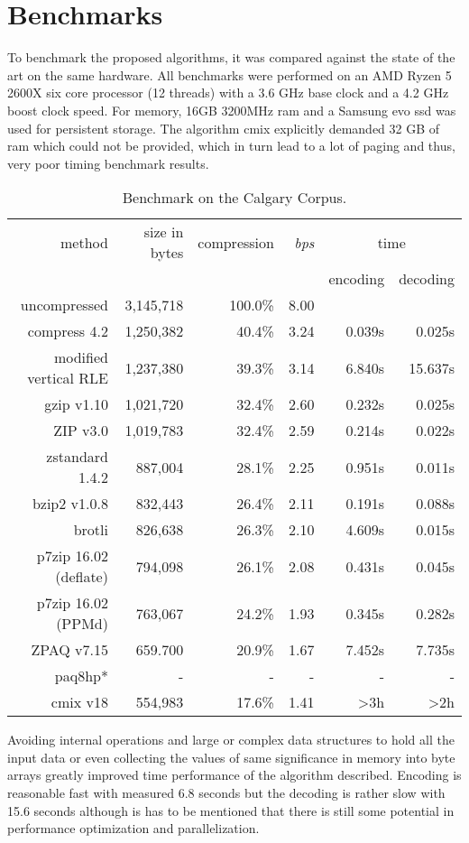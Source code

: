 \section{Benchmarks}
\label{ch:Evaluation:sec:Benchmarks}
\par{
	To benchmark the proposed algorithms, it was compared against the state of the art on the same hardware. All benchmarks were performed on an AMD Ryzen 5 2600X six core processor (12 threads) with a 3.6 GHz base clock and a 4.2 GHz boost clock speed. For memory, 16GB 3200MHz ram and a Samsung evo ssd was used for persistent storage. The algorithm cmix explicitly demanded 32 GB of ram which could not be provided, which in turn lead to a lot of paging and thus, very poor timing benchmark results.
}
	\begin{table}[h]
	\begin{tabular}{r|r|r|r|r|r}
		method  &  size in bytes & compression & \textit{bps} & \multicolumn{2}{c}{time }\\
		& & & & encoding & decoding\\
		\hline
		uncompressed & 3,145,718 & 100.0\% & 8.00 & &\\
		compress 4.2 & 1,250,382 & 40.4\% & 3.24 & 0.039s & 0.025s\\
		modified vertical RLE & 1,237,380 & 39.3\%& 3.14 & 6.840s & 15.637s\\
		gzip v1.10 & 1,021,720 & 32.4\% & 2.60 & 0.232s & 0.025s\\
		ZIP v3.0 & 1,019,783 & 32.4\% & 2.59 & 0.214s & 0.022s\\
		zstandard 1.4.2& 887,004 & 28.1\% & 2.25 & 0.951s & 0.011s\\
		bzip2 v1.0.8 & 832,443 & 26.4\% & 2.11 & 0.191s & 0.088s\\
		brotli & 826,638 & 26.3\%& 2.10 & 4.609s & 0.015s\\
		p7zip 16.02 (deflate) &  794,098 & 26.1\% & 2.08 & 0.431s & 0.045s \\
		p7zip 16.02 (PPMd) &  763,067& 24.2\% & 1.93 & 0.345s & 0.282s\\
		ZPAQ v7.15 & 659.700 & 20.9\% & 1.67 & 7.452s & 7.735s\\
		paq8hp* & - & - & - & - & -\\ 
		cmix v18 & 554,983 & 17.6\% & 1.41 & >3h & >2h		
	\end{tabular}
	\label{tab:t100benchmark}
	\caption{Benchmark on the Calgary Corpus.}
\end{table}
\par{
	Avoiding internal operations and large or complex data structures to hold all the input data or even collecting the values of same significance in memory into byte arrays greatly improved time performance of the algorithm described. Encoding is reasonable fast with measured 6.8 seconds but the decoding is rather slow with 15.6 seconds although is has to be mentioned that there is still some potential in performance optimization and parallelization.
}

